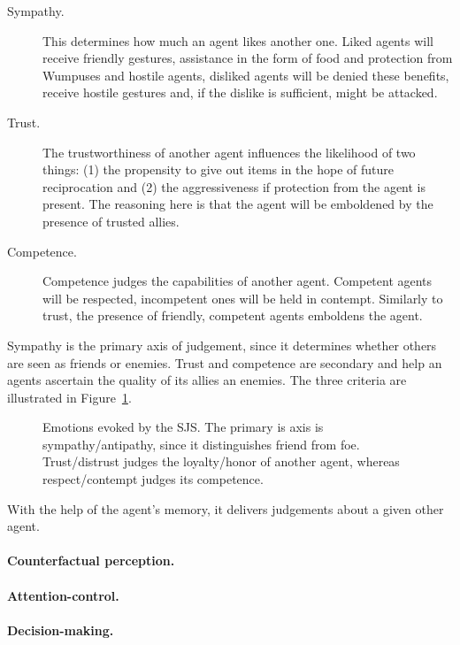 \begin{description}
	\item[Sympathy.] This determines how much an agent likes another one. Liked agents will receive friendly gestures, assistance in the form of food and protection from Wumpuses and hostile agents, disliked agents will be denied these benefits, receive hostile gestures and, if the dislike is sufficient, might be attacked.
	\item[Trust.] The trustworthiness of another agent influences the likelihood of two things: (1) the propensity to give out items in the hope of future reciprocation and (2) the aggressiveness if protection from the agent is present. The reasoning here is that the agent will be emboldened by the presence of trusted allies.
	\item[Competence.] Competence judges the capabilities of another agent. Competent agents will be respected, incompetent ones will be held in contempt. Similarly to trust, the presence of friendly, competent agents emboldens the agent.
\end{description}

Sympathy is the primary axis of judgement, since it determines whether others are seen as friends or enemies. Trust and competence are secondary and help an agents ascertain the quality of its allies an enemies. The three criteria are illustrated in Figure~\ref{fig:SJS}.

\begin{figure}
	\centering
	
	\caption{Emotions evoked by the SJS. The primary is axis is sympathy/antipathy, since it distinguishes friend from foe. Trust/distrust judges the loyalty/honor of another agent, whereas respect/contempt judges its competence.}
	\label{fig:SJS}
\end{figure}

With the help of the agent's memory, it delivers judgements about a given other agent.

\paragraph{Counterfactual perception.}

\paragraph{Attention-control.}

\paragraph{Decision-making.}

